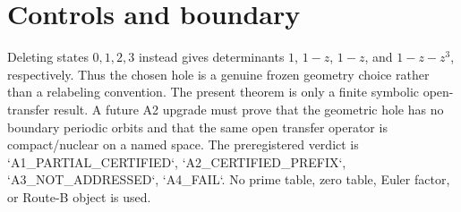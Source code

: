 \documentclass[10pt]{article}
\begin{document}
\section{Controls and boundary}
Deleting states $0,1,2,3$ instead gives determinants $1$, $1-z$, $1-z$, and
$1-z-z^3$, respectively.  Thus the chosen hole is a genuine frozen geometry
choice rather than a relabeling convention.  The present theorem is only a
finite symbolic open-transfer result.  A future A2 upgrade must prove that the
geometric hole has no boundary periodic orbits and that the same open transfer
operator is compact/nuclear on a named space.  The preregistered verdict is
`A1\_PARTIAL\_CERTIFIED`, `A2\_CERTIFIED\_PREFIX`, `A3\_NOT\_ADDRESSED`,
`A4\_FAIL`.  No prime table, zero table, Euler factor, or Route-B object is
used.
\end{document}
